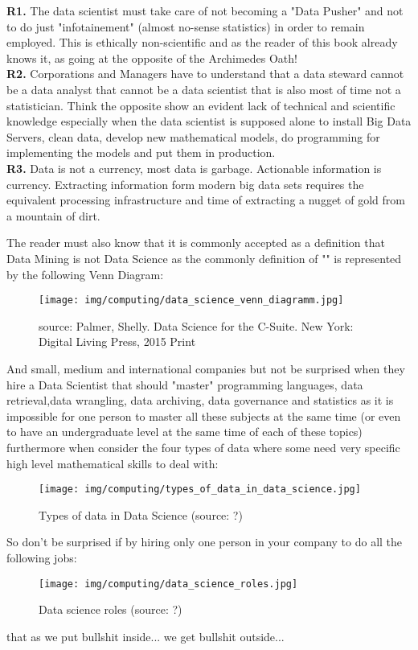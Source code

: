 	\begin{tcolorbox}[title=Remarks,colframe=black,arc=10pt]
	\textbf{R1.} The data scientist must take care of not becoming a "Data Pusher" and not to do just "infotainement" (almost no-sense statistics) in order to remain employed. This is ethically non-scientific and as the reader of this book already knows it, as going at the opposite of the Archimedes Oath!\\
	
	\textbf{R2.} Corporations and Managers have to understand that a data steward cannot be a data analyst that cannot be a data scientist that is also most of time not a statistician. Think the opposite show an evident lack of technical and scientific knowledge especially when the data scientist is supposed alone to install Big Data Servers, clean data, develop new mathematical models, do programming for implementing the models and put them in production.\\
	
	\textbf{R3.} Data is not a currency, most data is garbage. Actionable information is currency. Extracting information form modern big data sets requires the equivalent processing infrastructure and time of extracting a nugget of gold from a mountain of dirt.
	\end{tcolorbox}
	The reader must also know that it is commonly accepted as a definition that Data Mining is not Data Science as the commonly definition of "" is represented by the following Venn Diagram:
	\begin{figure}[H]
		\centering
		\texttt{[image: img/computing/data\_science\_venn\_diagramm.jpg]}
		\caption[Data science]{source: Palmer, Shelly. Data Science for the C-Suite. New York: Digital Living Press, 2015 Print}
	\end{figure}
	And small, medium and international companies but not be surprised when they hire a Data Scientist that should "master" programming languages, data retrieval,data wrangling, data archiving, data governance and statistics as it is impossible for one person to master all these subjects at the same time (or even to have an undergraduate level at the same time of each of these topics) furthermore when consider the four types of data where some need very specific high level mathematical skills to deal with:
	\begin{figure}[H]
		\centering
		\texttt{[image: img/computing/types\_of\_data\_in\_data\_science.jpg]}
		\caption[Types of data in Data Science]{Types of data in Data Science (source: ?)}
	\end{figure}
	So don't be surprised if by hiring only one person in your company to do all the following jobs:
	\begin{figure}[H]
		\centering
		\texttt{[image: img/computing/data\_science\_roles.jpg]}
		\caption[Data science roles]{Data science roles (source: ?)}
	\end{figure}
	that as we put bullshit inside... we get bullshit outside...
	
